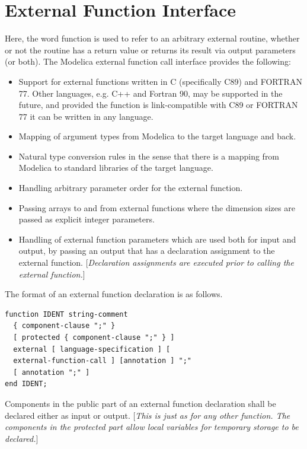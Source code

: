 \documentclass[10pt,a4paper]{report}
\def\doublelabel#1{\label{#1}}
\begin{document}
\section{External Function Interface}\doublelabel{external-function-interface}

Here, the word function is used to refer to an arbitrary external
routine, whether or not the routine has a return value or returns its
result via output parameters (or both). The Modelica external function
call interface provides the following:

\begin{itemize}
\item
  Support for external functions written in C (specifically C89) and
  FORTRAN 77. Other languages, e.g. C++ and Fortran 90, may be supported
  in the future, and provided the function is link-compatible with C89
  or FORTRAN 77 it can be written in any language.
\item
  Mapping of argument types from Modelica to the target language and
  back.
\item
  Natural type conversion rules in the sense that there is a mapping
  from Modelica to standard libraries of the target language.
\item
  Handling arbitrary parameter order for the external function.
\item
  Passing arrays to and from external functions where the dimension
  sizes are passed as explicit integer parameters.
\item
  Handling of external function parameters which are used both for input
  and output, by passing an output that has a declaration assignment to
  the external function. {[}\emph{Declaration assignments are executed
  prior to calling the external function.}{]}
\end{itemize}

The format of an external function declaration is as follows.

\begin{lstlisting}[language=grammar]
function IDENT string-comment
  { component-clause ";" }
  [ protected { component-clause ";" } ]
  external [ language-specification ] [
  external-function-call ] [annotation ] ";"
  [ annotation ";" ]
end IDENT;
\end{lstlisting}
Components in the public part of an external function declaration shall
be declared either as input or output. {[}\emph{This is just as for any
other function. The components in the protected part allow local
variables for temporary storage to be declared.}{]}
\end{document}
